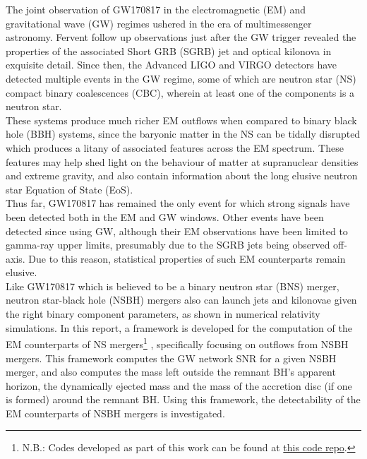The joint observation of GW170817 in the electromagnetic (EM) and gravitational wave
(GW) regimes ushered in the era of multimessenger astronomy. Fervent follow up
observations just after the GW trigger revealed the properties of the associated Short
GRB (SGRB) jet and optical kilonova in exquisite detail. Since then, the Advanced LIGO
and VIRGO detectors have detected multiple events in the GW regime, some of which are
neutron star (NS) compact binary coalescences (CBC), wherein at least one of the
components is a neutron star.\\
These systems produce much richer EM outflows when compared to binary black hole (BBH)
systems, since the baryonic matter in the NS can be tidally disrupted which produces a
litany of associated features across the EM spectrum. These features may help shed light
on the behaviour of matter at supranuclear densities and extreme gravity, and also
contain information about the long elusive neutron star Equation of State (EoS).\\ Thus
far, GW170817 has remained the only event for which strong signals have been detected
both in the EM and GW windows. Other events have been detected since using GW, although
their EM observations have been limited to gamma-ray upper limits, presumably due to the
SGRB jets being observed off-axis. Due to this reason, statistical properties of such EM
counterparts remain elusive.\\
Like GW170817 which is believed to be a binary neutron star (BNS) merger, neutron
star-black hole (NSBH) mergers also can launch jets and kilonovae given the right binary
component parameters, as shown in numerical relativity simulations. In this report, a
framework is developed for the computation of the EM counterparts of NS mergers\footnote
{
    N.B.: Codes developed as part of this work can be found at
    \href{https://github.com/BSGalvan/nsbh-codes}{this code repo}.
}
, specifically focusing on outflows from NSBH mergers. This framework computes the
GW network SNR for a given NSBH merger, and also computes the mass left outside the
remnant BH's apparent horizon, the dynamically ejected mass and the mass of the
accretion disc (if one is formed) around the remnant BH. Using this framework, the
detectability of the EM counterparts of NSBH mergers is investigated.
